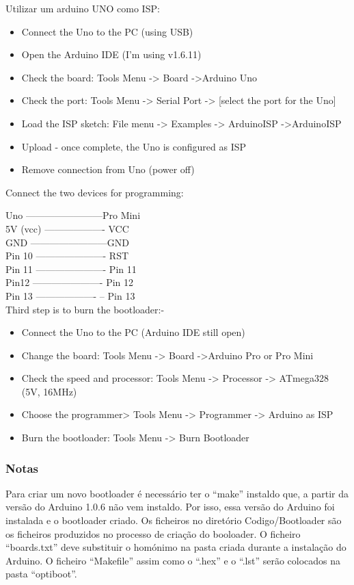 \documentclass{article}
\begin{document}
Utilizar um arduino UNO como ISP:
\begin{itemize}
\item 
Connect the Uno to the PC (using USB)
\item
Open the Arduino IDE (I'm using v1.6.11)
\item
Check the board: Tools Menu -> Board ->Arduino Uno
\item
Check the port: Tools Menu -> Serial Port -> [select the port for the Uno]
\item
Load the ISP sketch: File menu -> Examples -> ArduinoISP ->ArduinoISP
\item
Upload - once complete, the Uno is configured as ISP
\item
Remove connection from Uno (power off)
\end{itemize}

Connect the two devices for programming:

\noindent Uno ------------------------Pro Mini\\
5V (vcc) ------------------- VCC\\
GND ------------------------GND\\
Pin 10 ---------------------- RST\\
Pin 11 ---------------------- Pin 11\\
Pin12 ---------------------- Pin 12\\
Pin 13 ------------------- -- Pin 13\\

Third step is to burn the bootloader:-


\begin{itemize}
\item 
Connect the Uno to the PC (Arduino IDE still open)
\item
Change the board: Tools Menu -> Board ->Arduino Pro or Pro Mini
\item
Check the speed and processor: Tools Menu -> Processor -> ATmega328 (5V, 16MHz)
\item
Choose the programmer> Tools Menu -> Programmer -> Arduino as ISP
\item
Burn the bootloader: Tools Menu -> Burn Bootloader
\end{itemize}

\subsubsection{Notas}

Para criar um novo bootloader é necessário ter o ``make'' instaldo que, a partir da versão do Arduino 1.0.6 não vem instaldo. Por isso, essa versão do Arduino foi instalada e o bootloader criado. Os ficheiros no diretório Codigo/Bootloader são os ficheiros produzidos no processo de criação do booloader. O ficheiro ``boards.txt'' deve substituir o homónimo na pasta criada durante a instalação do Arduino. O ficheiro ``Makefile'' assim como o ``.hex'' e o ``.lst'' serão colocados na pasta ``optiboot''.
\end{document}
